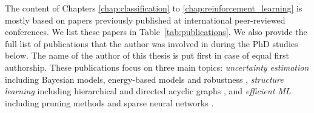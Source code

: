 The content of Chapters \ref{chap:classification} to \ref{chap:reinforcement_learning} is mostly based on papers previously published at international peer-reviewed conferences. We list these papers in Table~\ref{tab:publications}.
We also provide the full list of publications that the author was involved in during the PhD studies below. The name of the author of this thesis is put first in case of equal first authorship. These publications focus on three main topics: \emph{uncertainty estimation} including Bayesian models, energy-based models and robustness \citep{charpentier2020,NatPN2021,robustness-uncertainty-dirichlet,graph-postnet,uceloss,charpentier2022uncertainty-rl,ood_ebm,ayle2022robustness-sparse}, \emph{structure learning} including hierarchical and directed acyclic graphs \cite{charpentier2022dpdag,charpentier2019tsd,zugner2022endtoend,bonald2020scikitnetwork}, and \emph{efficient ML} including pruning methods and sparse neural networks \cite{rachwan2022earlycrop,ayle2022robustness-sparse}.

\renewcommand{\bibsection}{}
